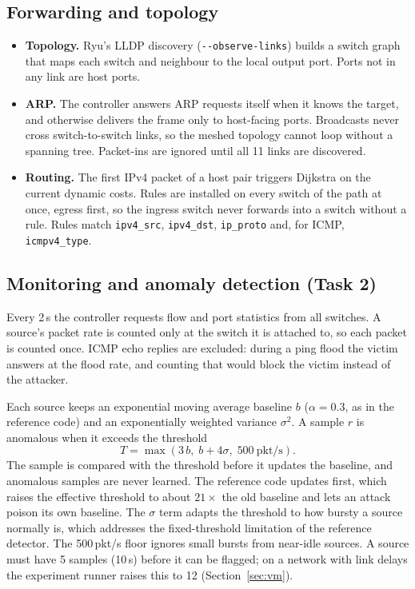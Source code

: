 \documentclass[11pt,a4paper]{article}
\newcommand{\code}[1]{\texttt{#1}}
\begin{document}
\subsection{Forwarding and topology}
\begin{itemize}
  \item \textbf{Topology.} Ryu's LLDP discovery (\code{-{}-observe-links}) builds a switch graph
        that maps each switch and neighbour to the local output port. Ports not in any link are host ports.
  \item \textbf{ARP.} The controller answers ARP requests itself when it knows the target, and otherwise
        delivers the frame only to host-facing ports. Broadcasts never cross switch-to-switch links, so the
        meshed topology cannot loop without a spanning tree. Packet-ins are ignored until all 11 links are
        discovered.
  \item \textbf{Routing.} The first IPv4 packet of a host pair triggers Dijkstra on the current dynamic costs.
        Rules are installed on every switch of the path at once, egress first, so the ingress switch never
        forwards into a switch without a rule. Rules match \code{ipv4\_src}, \code{ipv4\_dst},
        \code{ip\_proto} and, for ICMP, \code{icmpv4\_type}.
\end{itemize}

\subsection{Monitoring and anomaly detection (Task 2)}

Every 2\,s the controller requests flow and port statistics from all switches. A source's packet rate is counted
only at the switch it is attached to, so each packet is counted once. ICMP echo replies are excluded: during a
ping flood the victim answers at the flood rate, and counting that would block the victim instead of the
attacker.

Each source keeps an exponential moving average baseline $b$ ($\alpha=0.3$, as in the reference code) and an
exponentially weighted variance $\sigma^2$. A sample $r$ is anomalous when it exceeds the threshold
\begin{equation}
  T = \max\left(3\,b,\; b + 4\sigma,\; 500\ \text{pkt/s}\right).
  \label{eq:threshold}
\end{equation}
The sample is compared with the threshold before it updates the baseline, and anomalous samples are never
learned. The reference code updates first, which raises the effective threshold to about $21\times$ the old
baseline and lets an attack poison its own baseline. The $\sigma$ term adapts the threshold to how bursty a
source normally is, which addresses the fixed-threshold limitation of the reference detector. The 500\,pkt/s
floor ignores small bursts from near-idle sources. A source must have 5 samples (10\,s) before it can be
flagged; on a network with link delays the experiment runner raises this to 12 (Section~\ref{sec:vm}).
\end{document}
